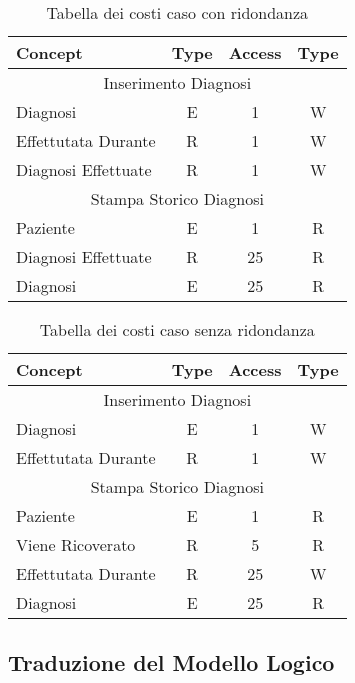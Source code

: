 \documentclass{article}
\begin{document}
\begin{table}[h!]
  \caption{Tabella dei costi caso con ridondanza}
  \label{table:3}
  \centering
  \begin{tabular}{|l|c|c|c|}
  \hline
  \textbf{Concept} & \textbf{Type} & \textbf{Access} & \textbf{Type} \\ \hline
  \multicolumn{4}{|c|}{Inserimento Diagnosi} \\ \hline
  Diagnosi & E & 1 & W \\ \hline
  Effettutata Durante & R & 1 & W \\ \hline
  Diagnosi Effettuate & R & 1 & W \\ \hline
  \multicolumn{4}{|c|}{Stampa Storico Diagnosi} \\ \hline
  Paziente & E & 1 & R \\ \hline
  Diagnosi Effettuate & R & 25 & R \\ \hline
  Diagnosi & E & 25 & R \\ \hline
  \end{tabular}
  \end{table}
\begin{table}[h!]
  \caption{Tabella dei costi caso senza ridondanza}
  \label{table:3}
  \centering
  \begin{tabular}{|l|c|c|c|}
  \hline
  \textbf{Concept} & \textbf{Type} & \textbf{Access} & \textbf{Type} \\ \hline
  \multicolumn{4}{|c|}{Inserimento Diagnosi} \\ \hline
  Diagnosi & E & 1 & W \\ \hline
  Effettutata Durante & R & 1 & W \\ \hline
  \multicolumn{4}{|c|}{Stampa Storico Diagnosi} \\ \hline
  Paziente & E & 1 & R \\ \hline
  Viene Ricoverato & R & 5 & R \\ \hline
  Effettutata Durante & R & 25 & W \\ \hline
  Diagnosi & E & 25 & R \\ \hline
  \end{tabular}
  \end{table}

\subsection{Traduzione del Modello Logico}

\end{document}
